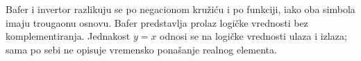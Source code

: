 
Bafer i invertor razlikuju se po negacionom kružiću i po funkciji, iako oba simbola imaju trougaonu osnovu. Bafer predstavlja prolaz logičke vrednosti bez komplementiranja. Jednakost \(y=x\) odnosi se na logičke vrednosti ulaza i izlaza; sama po sebi ne opisuje vremensko ponašanje realnog elementa.
